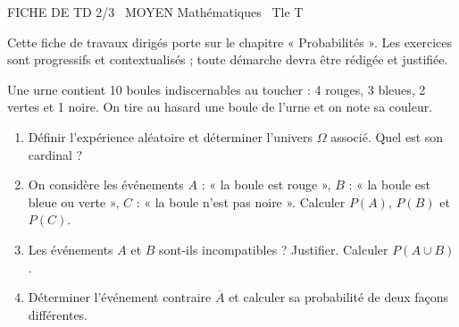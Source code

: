 \documentclass[11pt]{article}
\begin{document}
\begin{tcolorbox}[enhanced,colback=popink,colframe=popink,arc=10pt,boxrule=0pt,left=12pt,right=12pt,top=9pt,bottom=9pt]
{\color{white}\popxbold\small FICHE DE TD 2/3 \textbullet\ MOYEN \hfill Mathématiques \textbullet\ Tle T\par}
\end{tcolorbox}
\vspace{4pt}
Cette fiche de travaux dirigés porte sur le chapitre « Probabilités ». Les exercices sont progressifs et contextualisés ; toute démarche devra être rédigée et justifiée.

\begin{exercice}
Une urne contient 10 boules indiscernables au toucher : 4 rouges, 3 bleues, 2 vertes et 1 noire. On tire au hasard une boule de l'urne et on note sa couleur.
\begin{enumerate}
\item Définir l'expérience aléatoire et déterminer l'univers $\Omega$ associé. Quel est son cardinal ?
\item On considère les événements $A$ : « la boule est rouge », $B$ : « la boule est bleue ou verte », $C$ : « la boule n'est pas noire ». Calculer $P(A)$, $P(B)$ et $P(C)$.
\item Les événements $A$ et $B$ sont-ils incompatibles ? Justifier. Calculer $P(A \cup B)$.
\item Déterminer l'événement contraire $\overline{A}$ et calculer sa probabilité de deux façons différentes.
\end{enumerate}
\end{exercice}
\end{document}
